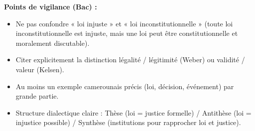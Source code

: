 \documentclass[11pt]{article}
\newcommand{\cle}[1]{{\popxbold\color{popdark}#1}}
\begin{document}
\begin{corrige}
\textbf{Points de vigilance (Bac) :}
\begin{itemize}
\item Ne pas confondre « loi injuste » et « loi inconstitutionnelle » (toute loi inconstitutionnelle est injuste, mais une loi peut être constitutionnelle et moralement discutable).
\item Citer explicitement la distinction \cle{légalité / légitimité} (Weber) ou \cle{validité / valeur} (Kelsen).
\item Au moins un exemple camerounais précis (loi, décision, événement) par grande partie.
\item Structure dialectique claire : Thèse (loi = justice formelle) / Antithèse (loi = injustice possible) / Synthèse (institutions pour rapprocher loi et justice).
\end{itemize}
\end{corrige}
\end{document}
